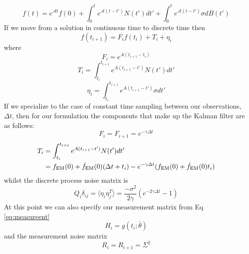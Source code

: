 \documentclass{tufte-handout} %
\begin{document}
\begin{equation}
	f(t) = e^{\mathcal{A}t}f(0) + \int_0^t e^{\mathcal{A}(t-t')} N(t') dt' + \int_0^t e^{\mathcal{A}(t-t')} \sigma dB(t')
\end{equation} 
If we move from a solution in continuous time to discrete time then
\begin{equation}
	f(t_{i+1}) = F_i f(t_i) + T_i + \eta_i
\end{equation}
where
\begin{equation}
	F_i = e^{A (t_{i+1} - t_i)}
\end{equation}
\begin{equation}
	T_i = \int_{t_i}^{t_{i+1}}  e^{A (t_{i+1} - t')} N(t') dt'
\end{equation}
\begin{equation}
	\eta_i = \int_{t_i}^{t_{i+1}}  e^{A (t_{i+1} - t')} \sigma dt'
\end{equation}
\noindent  If we specialize to the case of constant time sampling between our observations, $\Delta t$, then for our formulation the components that make up the Kalman filter are as follows: 
\begin{equation}
	F_i = F_{i+1} = e^{-\gamma \Delta t}
	\label{eq:fmatrix}
\end{equation}
\begin{align}
	T_i &= \int_{t_i}^{t_{i+1}}  e^{A (t_{i+1} - t')} N(t') dt' \\
	& = f_{\rm EM}(0) + \dot{f}_{\rm EM}(0)  (\Delta t + t_i) - e^{-\gamma \Delta t} (f_{\rm EM}(0) + \dot{f}_{\rm EM}(0)t_i)
\end{align}
whilst the discrete process noise matrix is
\begin{equation}
	Q_i  \delta_{ij}= \langle \eta_i \eta_j^T \rangle = \frac{- \sigma^2}{2 \gamma} \left( e^{-2 \gamma \Delta t} -1\right)
\end{equation}
At this point we can also specify our measurement matrix from Eq \ref{eq:measureent}
\begin{equation}
	H_i = g(t_i; \bar{\theta})
\end{equation}
and the measurement noise matrix 
\begin{equation}
	R_i = R_{i+1} = \Sigma^2
	\label{eq:rmatix}
\end{equation}
\end{document}
